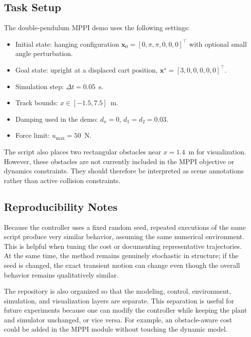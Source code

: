 \documentclass[conference]{IEEEtran}
\begin{document}
\subsection{Task Setup}
The double-pendulum MPPI demo uses the following settings:
\begin{itemize}
\item Initial state: hanging configuration $\bm{x}_0 = [0,\pi,\pi,0,0,0]^\top$ with optional small angle perturbation.
\item Goal state: upright at a displaced cart position, $\bm{x}^\star = [3,0,0,0,0,0]^\top$.
\item Simulation step: $\Delta t = 0.05$~s.
\item Track bounds: $x \in [-1.5, 7.5]$~m.
\item Damping used in the demo: $d_x = 0$, $d_1 = d_2 = 0.03$.
\item Force limit: $u_{\max}=50$~N.
\end{itemize}
The script also places two rectangular obstacles near $x=1.4$~m for visualization. However, these obstacles are not currently included in the MPPI objective or dynamics constraints. They should therefore be interpreted as scene annotations rather than active collision constraints.

\subsection{Reproducibility Notes}
Because the controller uses a fixed random seed, repeated executions of the same script produce very similar behavior, assuming the same numerical environment. This is helpful when tuning the cost or documenting representative trajectories. At the same time, the method remains genuinely stochastic in structure; if the seed is changed, the exact transient motion can change even though the overall behavior remains qualitatively similar.

The repository is also organized so that the modeling, control, environment, simulation, and visualization layers are separate. This separation is useful for future experiments because one can modify the controller while keeping the plant and simulator unchanged, or vice versa. For example, an obstacle-aware cost could be added in the MPPI module without touching the dynamic model.
\end{document}
